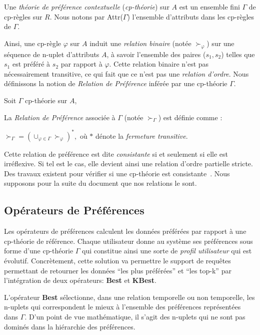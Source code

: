 Une \textit{théorie de préférence contextuelle} (\textit{cp-théorie}) sur $A$ est un ensemble fini $\Gamma$ de cp-règles sur $R$. Nous notons par Attr($\Gamma$) l'ensemble d'attributs dans les cp-règles de $\Gamma$.

Ainsi, une cp-règle $\varphi$ sur $A$ induit une \textit{relation binaire} (notée $\succ_\varphi$) sur une séquence de n-uplet d'attributs $A$, à savoir l'ensemble des paires ($s_1,s_2$) telles que $s_1$ est préféré à $s_2$ par rapport à $\varphi$. Cette relation binaire n'est pas nécessairement transitive, ce qui fait que ce n'est pas une \textit{relation d'ordre}. Nous définissons la notion de \textit{Relation de Préférence} inférée par une cp-théorie $\Gamma$.

\begin{defi}
Soit $\Gamma$ cp-théorie sur $A$,

La \textit{Relation de Préférence} associée à $\Gamma$ (notée $\succ_\Gamma$) est définie comme :
\begin{center} $\succ_\Gamma = (\cup_{\varphi \in \Gamma} \succ_\varphi)^*,$ o\`u $*$ dénote la \textit{fermeture transitive}.\end{center}
\end{defi}

Cette relation de préférence est dite \textit{consistante} si et seulement si elle est irréflexive. Si tel est le cas, elle devient ainsi une relation d'ordre partielle stricte. Des travaux existent pour vérifier si une cp-théorie est consistante~\cite{Wilson:cpnet}. Nous supposons pour la suite du document que nos relations le sont.

\subsection{Opérateurs de Préférences}
Les opérateurs de préférences calculent les données préférées par rapport à une cp-th\'eorie de référence. Chaque utilisateur donne au système ses préférences sous forme d'une cp-th\'eorie $\Gamma$ qui constitue ainsi une sorte de \textit{profil utilisateur} qui est évolutif. Concrètement, cette solution va permettre le support de requêtes 
permettant de retourner les données \enquote{les plus préférées} et \enquote{les top-k} par l'intégration de deux opérateurs: \textbf{Best} et \textbf{KBest}.

L'opérateur \textbf{Best} sélectionne, dans une relation temporelle ou non temporelle, les n-uplets qui correspondent le mieux à l'ensemble des préférences représentées dans $\Gamma$. D'un point de vue mathématique, il s'agit des n-uplets qui ne sont pas dominés dans la hiérarchie des préférences.

